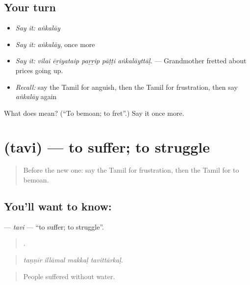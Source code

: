 \subsection*{Your turn}
\begin{itemize}
\raggedright
  \item \emph{Say it:} \emph{aṅkalāy}
  \item \emph{Say it:} \emph{aṅkalāy}, once more
  \item \emph{Say it:} \emph{vilai ēṟiyataip paṟṟip pāṭṭi aṅkalāyttāḷ.} — Grandmother fretted about prices going up.
  \item \emph{Recall:} say the Tamil for anguish, then the Tamil for frustration, then say \emph{aṅkalāy} again
\end{itemize}

\begin{tcolorbox}[breakable,colback=teal!4,colframe=teal!35!black,title={Before you move on}]
What does  mean? (\textquotedblleft{}To bemoan; to fret\textquotedblright{}.) Say it once more.
\end{tcolorbox}
\section[\texorpdfstring{\ta{தவி} (tavi)}{தவி (tavi)}]{ (tavi) — to suffer; to struggle}

\label{lesson:TA-C455-tavi}



\begin{quote}
Before the new one: say the Tamil for frustration, then the Tamil for to bemoan.
\end{quote}

\subsection*{You'll want to know: }
\textbf{} — \emph{tavi} — \textquotedblleft{}to suffer; to struggle\textquotedblright{}.

\begin{quote}
   .
\end{quote}

\begin{quote}
\emph{taṇṇīr illāmal makkaḷ tavittārkaḷ.}
\end{quote}

\begin{quote}
People suffered without water.
\end{quote}

